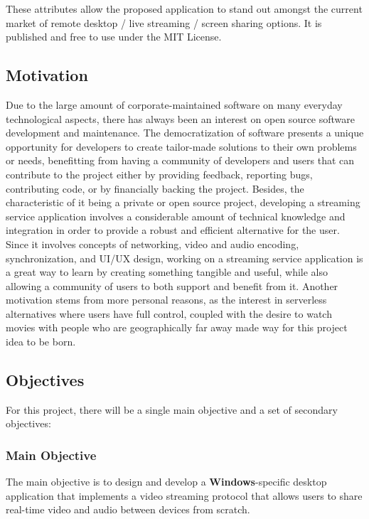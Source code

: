 \documentclass{article}
\begin{document}
These attributes allow the proposed application to stand out amongst the current market of remote desktop / live streaming / screen sharing options. It is published and free to use under the MIT License.

\subsection{Motivation}

Due to the large amount of corporate-maintained software on many everyday technological aspects, there has always been an interest on open source software development and maintenance. The democratization of software  
presents a unique opportunity for developers to create tailor-made solutions to their own problems or needs, benefitting from having a community of developers and users that can contribute to the project either by providing feedback, reporting bugs, contributing code, or by financially
backing the project. Besides, the characteristic of it being a private or open source project, developing a streaming service application involves a considerable amount of technical knowledge and integration in order to provide a robust and efficient
alternative for the user. Since it involves concepts of networking, video and audio encoding, synchronization, and UI/UX design, working on a streaming service application is a great way to learn by creating something tangible and useful, while also allowing a community of users to both
support and benefit from it. Another motivation stems from more personal reasons, as the interest in serverless alternatives where users have full control, coupled with the desire to watch movies with people who are geographically far away made way for this project idea to be born. 



\subsection{Objectives}
For this project, there will be a single main objective and a set of secondary objectives: 
\subsubsection{Main Objective}
The main objective is to design and develop a \textbf{Windows}-specific desktop application that implements a video streaming protocol that allows users to share real-time video and audio between devices from scratch.
\end{document}
